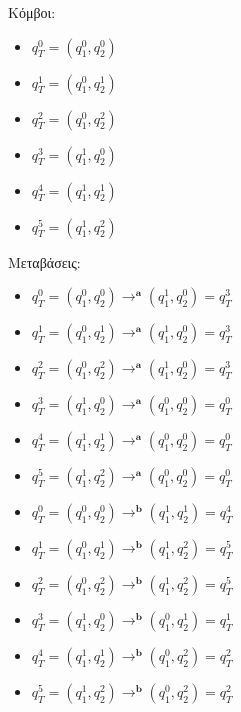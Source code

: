 Κόμβοι:
\reducevspace\reducevspace\reducevspace\reducevspace\reducevspace\reducevspace\reducevspace
\reducevspace\reducevspace\reducevspace\reducevspace\reducevspace\reducevspace\reducevspace
\begin{multicols}{3}
	\begin{itemize}
		\itemsep0em
		\item $q_T^{0} = (q_1^{0}, q_2^{0})$
		\item $q_T^{1} = (q_1^{0}, q_2^{1})$

		\item $q_T^{2} = (q_1^{0}, q_2^{2})$
		\item $q_T^{3} = (q_1^{1}, q_2^{0})$

		\item $q_T^{4} = (q_1^{1}, q_2^{1})$
		\item $q_T^{5} = (q_1^{1}, q_2^{2})$
	\end{itemize}
\end{multicols}
\reducevspace\reducevspace\reducevspace\reducevspace\reducevspace\reducevspace\reducevspace
\par Μεταβάσεις:
\reducevspace\reducevspace\reducevspace\reducevspace\reducevspace\reducevspace\reducevspace
\reducevspace\reducevspace\reducevspace\reducevspace\reducevspace\reducevspace\reducevspace
\begin{multicols}{2}
	\begin{itemize}
		\itemsep0em
		\item $q_T^{0} = (q_1^{0}, q_2^{0}) \bm{\rightarrow^{a}} (q_1^{1}, q_2^{0}) = q_T^{3}$
		\item $q_T^{1} = (q_1^{0}, q_2^{1}) \bm{\rightarrow^{a}} (q_1^{1}, q_2^{0}) = q_T^{3}$
		\item $q_T^{2} = (q_1^{0}, q_2^{2}) \bm{\rightarrow^{a}} (q_1^{1}, q_2^{0}) = q_T^{3}$
		\item $q_T^{3} = (q_1^{1}, q_2^{0}) \bm{\rightarrow^{a}} (q_1^{0}, q_2^{0}) = q_T^{0}$
		\item $q_T^{4} = (q_1^{1}, q_2^{1}) \bm{\rightarrow^{a}} (q_1^{0}, q_2^{0}) = q_T^{0}$
		\item $q_T^{5} = (q_1^{1}, q_2^{2}) \bm{\rightarrow^{a}} (q_1^{0}, q_2^{0}) = q_T^{0}$

		\item $q_T^{0} = (q_1^{0}, q_2^{0}) \bm{\rightarrow^{b}} (q_1^{1}, q_2^{1}) = q_T^{4}$
		\item $q_T^{1} = (q_1^{0}, q_2^{1}) \bm{\rightarrow^{b}} (q_1^{1}, q_2^{2}) = q_T^{5}$
		\item $q_T^{2} = (q_1^{0}, q_2^{2}) \bm{\rightarrow^{b}} (q_1^{1}, q_2^{2}) = q_T^{5}$
		\item $q_T^{3} = (q_1^{1}, q_2^{0}) \bm{\rightarrow^{b}} (q_1^{0}, q_2^{1}) = q_T^{1}$
		\item $q_T^{4} = (q_1^{1}, q_2^{1}) \bm{\rightarrow^{b}} (q_1^{0}, q_2^{2}) = q_T^{2}$
		\item $q_T^{5} = (q_1^{1}, q_2^{2}) \bm{\rightarrow^{b}} (q_1^{0}, q_2^{2}) = q_T^{2}$
	\end{itemize}
\end{multicols}
